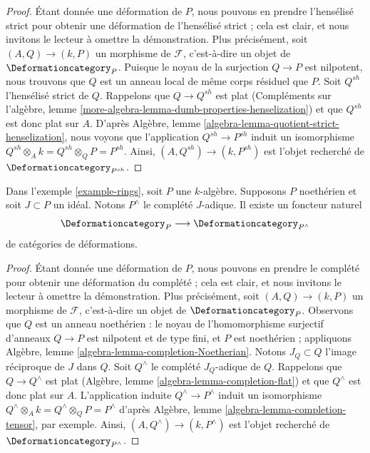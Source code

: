 \begin{proof}
Étant donnée une déformation de $P$, nous pouvons en prendre l'hensélisé strict
pour obtenir une déformation de l'hensélisé strict ; cela est
clair, et nous invitons le lecteur à omettre la démonstration. Plus précisément,
soit $(A, Q) \to (k, P)$ un morphisme de $\mathcal{F}$, c'est-à-dire
un objet de $\Deformationcategory_P$. Puisque le noyau de la surjection
$Q \to P$ est nilpotent, nous trouvons que $Q$ est un anneau local de
même corps résiduel que $P$. Soit $Q^{sh}$ l'hensélisé strict
de $Q$. Rappelons que $Q \to Q^{sh}$ est plat
(Compléments sur l'algèbre, lemme \ref{more-algebra-lemma-dumb-properties-henselization})
et que $Q^{sh}$ est donc plat sur $A$.
D'après Algèbre, lemme \ref{algebra-lemma-quotient-strict-henselization},
nous voyons que l'application $Q^{sh} \to P^{sh}$ induit un isomorphisme
$Q^{sh} \otimes_A k = Q^{sh} \otimes_Q P = P^{sh}$.
Ainsi, $(A, Q^{sh}) \to (k, P^{sh})$ est l'objet recherché de
$\Deformationcategory_{P^{sh}}$.
\end{proof}

\begin{lemma}
\label{lemma-completion}
Dans l'exemple \ref{example-rings}, soit $P$ une $k$-algèbre.
Supposons $P$ noethérien et soit $J \subset P$ un idéal.
Notons $P^\wedge$ le complété $J$-adique.
Il existe un foncteur naturel
$$
\Deformationcategory_P \longrightarrow \Deformationcategory_{P^\wedge}
$$
de catégories de déformations.
\end{lemma}

\begin{proof}
Étant donnée une déformation de $P$, nous pouvons en prendre le complété
pour obtenir une déformation du complété ; cela est
clair, et nous invitons le lecteur à omettre la démonstration. Plus précisément,
soit $(A, Q) \to (k, P)$ un morphisme de $\mathcal{F}$, c'est-à-dire
un objet de $\Deformationcategory_P$. Observons que $Q$ est un anneau
noethérien : le noyau de l'homomorphisme surjectif d'anneaux $Q \to P$ est
nilpotent et de type fini, et $P$ est noethérien ; appliquons
Algèbre, lemme \ref{algebra-lemma-completion-Noetherian}.
Notons $J_Q \subset Q$ l'image
réciproque de $J$ dans $Q$. Soit $Q^\wedge$ le complété $J_Q$-adique de $Q$.
Rappelons que $Q \to Q^\wedge$ est plat
(Algèbre, lemme \ref{algebra-lemma-completion-flat})
et que $Q^\wedge$ est donc plat sur $A$.
L'application induite $Q^\wedge \to P^\wedge$ induit un isomorphisme
$Q^\wedge \otimes_A k = Q^\wedge \otimes_Q P = P^\wedge$ d'après
Algèbre, lemme \ref{algebra-lemma-completion-tensor}, par exemple.
Ainsi, $(A, Q^\wedge) \to (k, P^\wedge)$
est l'objet recherché de $\Deformationcategory_{P^\wedge}$.
\end{proof}

